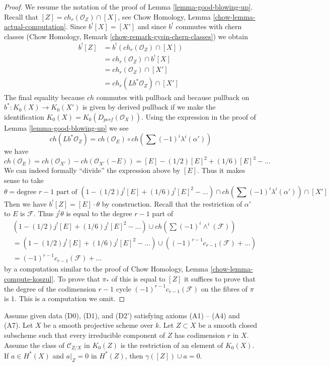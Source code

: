 \begin{proof}
We resume the notation of the proof of Lemma \ref{lemma-good-blowing-up}.
Recall that $[Z] = ch_r(\mathcal{O}_Z) \cap [X]$, see
Chow Homology, Lemma \ref{chow-lemma-actual-computation}.
Since $b^![X] = [X']$ and since $b^!$ commutes with chern classes
(Chow Homology, Remark \ref{chow-remark-gysin-chern-classes}) we obtain
\begin{align*}
b^![Z] & =
b^! (ch_r(\mathcal{O}_Z) \cap [X]) \\
& =
ch_r(\mathcal{O}_Z) \cap b^![X] \\
& =
ch_r(\mathcal{O}_Z) \cap [X'] \\
& =
ch_r(Lb^*\mathcal{O}_Z) \cap [X']
\end{align*}
The final equality because $ch$ commutes with pullback and
because pullback on $b^* : K_0(X) \to K_0(X')$ is given by derived
pullback if we make the identification
$K_0(X) = K_0(D_{perf}(\mathcal{O}_X))$.
Using the expression in the proof of Lemma \ref{lemma-good-blowing-up}
we see
$$
ch(Lb^*\mathcal{O}_Z) =
ch(\mathcal{O}_E) \circ ch\left(\sum (-1)^i\lambda^i(\alpha')\right)
$$
we have
$$
ch(\mathcal{O}_E) = ch(\mathcal{O}_{X'}) - ch(\mathcal{O}_{X'}(-E)) =
[E] - (1/2)[E]^2 + (1/6)[E]^3 - \ldots
$$
We can indeed formally ``divide'' the expression above by $[E]$.
Thus it makes sense to take
$$
\theta = \text{degree }r - 1\text{ part of }
(1 - (1/2)j^![E] + (1/6)j^![E]^2 - \ldots) \cap
ch(\sum (-1)^i\lambda^i(\alpha')) \cap [X']
$$
Then we have $b^![Z] = [E] \cdot \theta$ by construction.
Recall that the restriction of $\alpha'$ to $E$ is $\mathcal{F}$.
Thus $j^!\theta$ is equal to the degree $r - 1$ part of
\begin{align*}
& (1 - (1/2)j^![E] + (1/6)j^![E]^2 - \ldots) \cup
ch(\sum (-1)^i\wedge^i(\mathcal{F})) \\
& =
(1 - (1/2)j^![E] + (1/6)j^![E]^2 - \ldots) \cup
((-1)^{r - 1}c_{r - 1}(\mathcal{F}) + \ldots) \\
& = (-1)^{r - 1}c_{r - 1}(\mathcal{F}) + \ldots
\end{align*}
by a computation similar to the proof of
Chow Homology, Lemma \ref{chow-lemma-compute-koszul}.
To prove that $\pi_*$ of this is equal to $[Z]$ it
suffices to prove that the degree of the codimension $r - 1$ cycle
$(-1)^{r - 1}c_{r - 1}(\mathcal{F})$ on the fibres of $\pi$ is $1$.
This is a computation we omit.
\end{proof}

\begin{lemma}
\label{lemma-A5-A6-imply}
Assume given data (D0), (D1), and (D2') satisfying axioms (A1) -- (A4)
and (A7). Let $X$ be a smooth projective scheme over $k$. Let $Z \subset X$
be a smooth closed subscheme such that every irreducible component of $Z$
has codimension $r$ in $X$. Assume the class of
$\mathcal{C}_{Z/X}$ in $K_0(Z)$ is the restriction of an element of $K_0(X)$.
If $a \in H^*(X)$ and $a|_Z = 0$ in $H^*(Z)$, then
$\gamma([Z]) \cup a = 0$.
\end{lemma}

